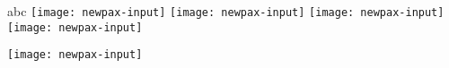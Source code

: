 \documentclass{article}
\begin{document}
abc
\texttt{[image: newpax-input]}
\texttt{[image: newpax-input]}
%
\texttt{[image: newpax-input]}
\texttt{[image: newpax-input]}

\texttt{[image: newpax-input]}

%
\end{document}
